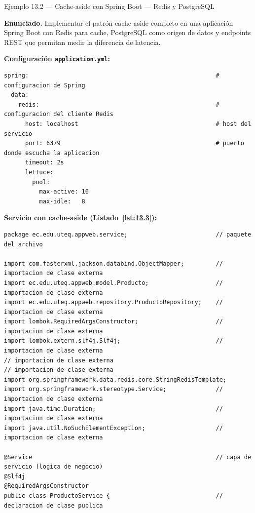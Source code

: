 \documentclass[11pt,a4paper,openany]{book}
\begin{document}
\begin{cajaejemplo}{Ejemplo 13.2 --- Cache-aside con Spring Boot --- Redis y PostgreSQL}


\textbf{Enunciado.} Implementar el patrón cache-aside completo en una aplicación Spring Boot con Redis para cache, PostgreSQL como origen de datos y endpoints REST que permitan medir la diferencia de latencia.

\textbf{Configuración \texttt{application.yml}:}
\begin{lstlisting}[style=yaml,numbers=none,caption={Ejemplo de YAML},label=lst:13.2]
spring:                                                     # configuracion de Spring
  data:
    redis:                                                  # configuracion del cliente Redis
      host: localhost                                       # host del servicio
      port: 6379                                            # puerto donde escucha la aplicacion
      timeout: 2s
      lettuce:
        pool:
          max-active: 16
          max-idle:   8
\end{lstlisting}

\textbf{Servicio con cache-aside (Listado~\ref{lst:13.3}):}
\begin{lstlisting}[style=java,caption={ProductoService.java},label=lst:13.3]
package ec.edu.uteq.appweb.service;                         // paquete del archivo

import com.fasterxml.jackson.databind.ObjectMapper;         // importacion de clase externa
import ec.edu.uteq.appweb.model.Producto;                   // importacion de clase externa
import ec.edu.uteq.appweb.repository.ProductoRepository;    // importacion de clase externa
import lombok.RequiredArgsConstructor;                      // importacion de clase externa
import lombok.extern.slf4j.Slf4j;                           // importacion de clase externa
// importacion de clase externa
// importacion de clase externa
import org.springframework.data.redis.core.StringRedisTemplate;
import org.springframework.stereotype.Service;              // importacion de clase externa
import java.time.Duration;                                  // importacion de clase externa
import java.util.NoSuchElementException;                    // importacion de clase externa

@Service                                                    // capa de servicio (logica de negocio)
@Slf4j
@RequiredArgsConstructor
public class ProductoService {                              // declaracion de clase publica


\end{lstlisting}
\end{cajaejemplo}
\end{document}
